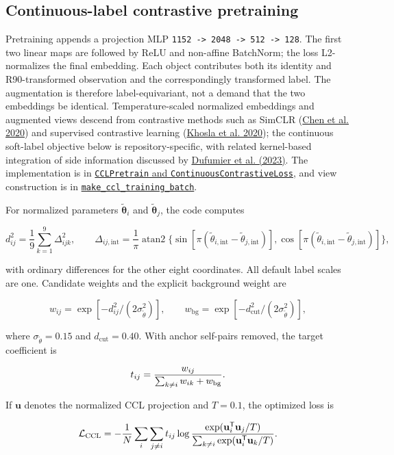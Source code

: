 \documentclass[11pt]{article}
\newcommand{\code}[1]{\nolinkurl{#1}}
\begin{document}
\subsection{Continuous-label contrastive pretraining}

Pretraining appends a projection MLP
\code{1152 -> 2048 -> 512 -> 128}. The first two linear maps are followed by ReLU
and non-affine BatchNorm; the loss L2-normalizes the final embedding. Each
object contributes both its identity and R90-transformed observation and the
correspondingly transformed label. The augmentation is therefore
label-equivariant, not a demand that the two embeddings be identical.
Temperature-scaled normalized embeddings and augmented views descend from
contrastive methods such as SimCLR (\hyperlink{ref:chen2020}{Chen et al. 2020}) and
supervised contrastive learning (\hyperlink{ref:khosla2020}{Khosla et al. 2020}); the
continuous soft-label objective below is repository-specific, with related
kernel-based integration of side information discussed by \hyperlink{ref:dufumier2023}{Dufumier et al. (2023)}.
The implementation is in \href{../arch/networks.py}{\code{CCLPretrain} and \code{ContinuousContrastiveLoss}}, and view construction is in
\href{../arch/train.py}{\code{make_ccl_training_batch}}.

For normalized parameters \(\widetilde{\bm\theta}_i\) and \(\widetilde{\bm\theta}_j\), the code
computes

\[
d_{ij}^2=\frac{1}{9}\sum_{k=1}^9\Delta_{ijk}^2,
\qquad
\Delta_{ij,\mathrm{int}}=
\frac{1}{\pi}\operatorname{atan2}
\{\sin[\pi(\widetilde\theta_{i,\mathrm{int}}-\widetilde\theta_{j,\mathrm{int}})],
  \cos[\pi(\widetilde\theta_{i,\mathrm{int}}-\widetilde\theta_{j,\mathrm{int}})]\},
\]

with ordinary differences for the other eight coordinates. All default label
scales are one. Candidate weights and the explicit background weight are

\[
w_{ij}=\exp[-d_{ij}^2/(2\sigma_{\widetilde\theta}^2)],\qquad
w_\mathrm{bg}=\exp[-d_\mathrm{cut}^2/(2\sigma_{\widetilde\theta}^2)],
\]

where \(\sigma_{\widetilde\theta}=0.15\) and \(d_\mathrm{cut}=0.40\). With anchor self-pairs
removed, the target coefficient is

\[
t_{ij}=\frac{w_{ij}}{\sum_{k\ne i}w_{ik}+w_{\rm bg}}.
\]

If \(\mathbf u\) denotes the normalized CCL projection and \(T=0.1\), the
optimized loss is

\[
\mathcal L_{\rm CCL}=-\frac{1}{N}\sum_i\sum_{j\ne i}t_{ij}
\log\frac{\exp(\mathbf u_i^\mathsf T\mathbf u_j/T)}
{\sum_{k\ne i}\exp(\mathbf u_i^\mathsf T\mathbf u_k/T)}.
\]
\end{document}
